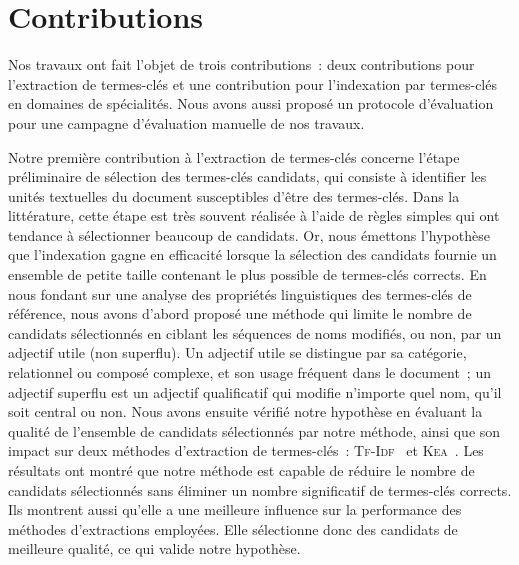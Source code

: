   \section{Contributions}
  \label{sec:main-conclusion-contributions}
    Nos travaux ont fait l'objet de trois contributions~: deux contributions
    pour l'extraction de termes-clés et une contribution pour l'indexation par
    termes-clés en domaines de spécialités. Nous avons aussi proposé un
    protocole d'évaluation pour une campagne d'évaluation manuelle de nos
    travaux.

    Notre première contribution à l'extraction de termes-clés concerne l'étape
    préliminaire de sélection des termes-clés candidats, qui consiste à
    identifier les unités textuelles du document susceptibles d'être des
    termes-clés. Dans la littérature, cette étape est très souvent réalisée à
    l'aide de règles simples qui ont tendance à sélectionner beaucoup de
    candidats. Or, nous émettons l'hypothèse que l'indexation gagne en
    efficacité lorsque la sélection des candidats fournie un ensemble de petite
    taille contenant le plus possible de termes-clés corrects.
    En nous fondant sur une analyse des propriétés linguistiques des termes-clés
    de référence, nous avons d'abord proposé une méthode qui limite le nombre de
    candidats sélectionnés en ciblant les séquences de noms modifiés, ou non,
    par un adjectif utile (non superflu). Un adjectif utile se distingue par sa
    catégorie, relationnel ou composé complexe, et son usage fréquent dans le
    document~; un adjectif superflu est un adjectif qualificatif qui modifie
    n'importe quel nom, qu'il soit central ou non.
    Nous avons ensuite vérifié notre hypothèse en évaluant la qualité de
    l'ensemble de candidats sélectionnés par notre méthode, ainsi que son impact
    sur deux méthodes d'extraction de termes-clés~:
    \textsc{Tf-Idf}~\cite{jones1972tfidf} et \textsc{Kea}~\cite{witten1999kea}.
    Les résultats ont montré que notre méthode est capable de réduire le nombre
    de candidats sélectionnés sans éliminer un nombre significatif de
    termes-clés corrects. Ils montrent aussi qu'elle a une meilleure influence
    sur la performance des méthodes d'extractions employées. Elle sélectionne
    donc des candidats de meilleure qualité, ce qui valide notre hypothèse.

